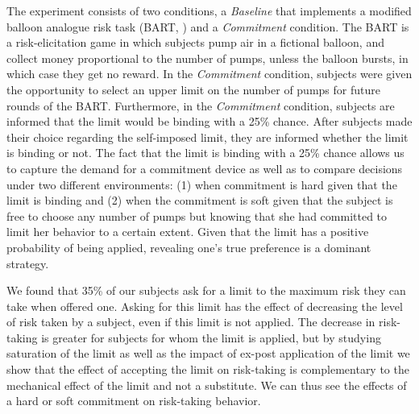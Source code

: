 \documentclass[
]{book}
\begin{document}
The experiment consists of two conditions, a \emph{Baseline} that implements a
modified balloon analogue risk task (BART, \citet{lejuez2002evaluation}) and a
\emph{Commitment} condition.
The BART is a risk-elicitation game in which subjects pump air in a fictional
balloon, and collect money proportional to the number of pumps, unless the
balloon bursts, in which case they get no reward.
In the \emph{Commitment} condition, subjects were given the opportunity to select an
upper limit on the number of pumps for future rounds of the BART.
Furthermore, in the \emph{Commitment} condition, subjects are informed that the limit
would be binding with a 25\% chance.
After subjects made their choice regarding the self-imposed limit, they are
informed whether the limit is binding or not.
The fact that the limit is binding with a 25\% chance allows us to capture the
demand for a commitment device as well as to compare decisions under two
different environments:
(1) when commitment is hard given that the limit is binding and
(2) when the commitment is soft given that the subject is free to choose any
number of pumps but knowing that she had committed to limit her behavior to a
certain extent.
Given that the limit has a positive probability of being applied, revealing
one's true preference is a dominant strategy.

We found that 35\% of our subjects ask for a limit to the maximum risk they can
take when offered one.
Asking for this limit has the effect of decreasing the level of risk taken by a
subject, even if this limit is not applied.
The decrease in risk-taking is greater for subjects for whom the limit is
applied, but by studying saturation of the limit as well as the impact of
ex-post application of the limit we show that the effect of accepting the limit
on risk-taking is complementary to the mechanical effect of the limit and not a
substitute.
We can thus see the effects of a hard or soft commitment on risk-taking
behavior.
\end{document}
